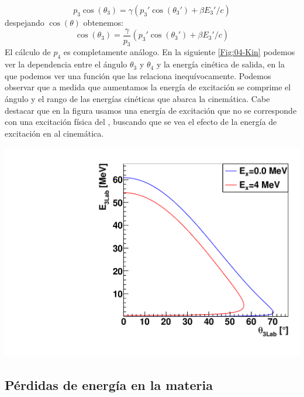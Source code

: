 \begin{minipage}{0.48\linewidth}
\begin{equation}
	p_3 \cos (\theta_3) = \gamma (p_3' \cos (\theta_3')+\beta E_3'/c)
\end{equation}
despejando $\cos (\theta)$ obtenemos:
\begin{equation}
	\cos (\theta_3) = \frac{\gamma}{p_3} (p_3' \cos (\theta_3')+\beta E_3'/c)
\end{equation}
El cálculo de $p_4$ es completamente análogo. En la siguiente \cref{Fig:04-Kin} podemos ver la dependencia entre el ángulo $\theta_3$ y $\theta_4$ y la energía cinética de salida, en la que podemos ver una función que las relaciona inequívocamente. Podemos observar que a medida que aumentamos la energía de excitación se comprime el ángulo y el rango de las energías cinéticas que abarca la cinemática. Cabe destacar que en la figura usamos una energía de excitación que no se corresponde con una excitación física del \litioDiez, buscando que se vea el efecto de la energía de excitación en al cinemática. 
\end{minipage}
\hfill 
\begin{minipage}{0.48\linewidth} \centering
	\includegraphics[width=1\linewidth]{Imagenes/Cinematica.pdf}

	\label{Fig:04-Kin}
\end{minipage}


\subsection{Pérdidas de energía en la materia}

